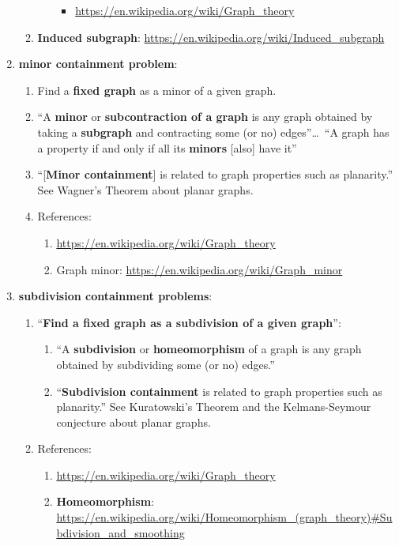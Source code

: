 \begin{enumerate}
\begin{enumerate}
\begin{enumerate}
			\begin{itemize} \itemsep -1pt
			\item \url{https://en.wikipedia.org/wiki/Graph_theory}
			\end{itemize}
		\end{enumerate}
	\item {\bf Induced subgraph}: \url{https://en.wikipedia.org/wiki/Induced_subgraph}
	\end{enumerate}
\item {\bf minor containment problem}: \vspace{-0.3cm}
	\begin{enumerate} \itemsep -2pt
	\item Find a {\bf fixed graph} as a minor of a given graph.
	\item ``A {\bf minor} or {\bf subcontraction of a graph} is any graph obtained by taking a {\bf subgraph} and contracting some (or no) edges''\dots\ ``A graph has a property if and only if all its {\bf minors} [also] have it''
	\item ``[{\bf Minor containment}] is related to graph properties such as planarity.'' See Wagner's Theorem about planar graphs.
	\item References: \vspace{-0.2cm}
		\begin{enumerate} \itemsep -2pt
		\item \url{https://en.wikipedia.org/wiki/Graph_theory}
		\item Graph minor: \url{https://en.wikipedia.org/wiki/Graph_minor}
		\end{enumerate}
	\end{enumerate}
\item {\bf subdivision containment problems}: \vspace{-0.3cm}
	\begin{enumerate} \itemsep -2pt
	\item ``{\bf Find a fixed graph as a subdivision of a given graph}'': \vspace{-0.2cm}
		\begin{enumerate} \itemsep -2pt
		\item ``A {\bf subdivision} or {\bf homeomorphism} of a graph is any graph obtained by subdividing some (or no) edges.''
		\item ``{\bf Subdivision containment} is related to graph properties such as planarity.'' See Kuratowski's Theorem and the Kelmans-Seymour conjecture about planar graphs.
		\end{enumerate}
	\item References: \vspace{-0.2cm}
		\begin{enumerate} \itemsep -2pt
		\item \url{https://en.wikipedia.org/wiki/Graph_theory}
		\item {\bf Homeomorphism}: \url{https://en.wikipedia.org/wiki/Homeomorphism_(graph_theory)#Subdivision_and_smoothing}
		\end{enumerate}
	\end{enumerate}
\end{enumerate}


